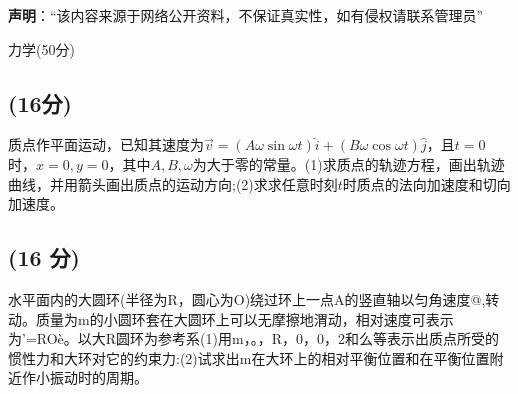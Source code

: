 
\textbf{声明}：“该内容来源于网络公开资料，不保证真实性，如有侵权请联系管理员”

力学(50分)
\subsection{(16分)}
质点作平面运动，已知其速度为$\vec{v} = (A \omega \sin \omega t) \hat{i} + (B \omega \cos \omega t) \hat{j}$，且$t=0$时，$x=0,y=0$，其中$A,B,\omega$为大于零的常量。(1)求质点的轨迹方程，画出轨迹曲线，并用箭头画出质点的运动方向;(2)求求任意时刻$t$时质点的法向加速度和切向
加速度。
\subsection{(16 分)}
水平面内的大圆环(半径为R，圆心为O)绕过环上一点A的竖直轴以匀角速度@,转动。质量为m的小圆环套在大圆环上可以无摩擦地渭动，相对速度可表示为’=ROè。以大R圆环为参考系(1)用m，。，R，0，0，2和么等表示出质点所受的惯性力和大环对它的约束力:(2)试求出m在大环上的相对平衡位置和在平衡位置附近作小振动时的周期。






